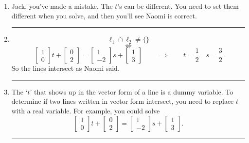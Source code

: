 \documentclass{article}
\begin{document}
	\begin{enumerate}
		\color{Violet} \vspace{.2cm} \hrule

		\item Jack, you've made a mistake. The $t$'s can be different.
			You need to set them different when you solve, and then
			you'll see Naomi is correct.

			\vspace{.2cm} \hrule

		\item
			\[
				\ell_{1}\cap \ell_{2}\neq \{\}
			\]
			\[
				\iff
			\]
			\[
				\begin{bmatrix}
					1\\
					0
				\end{bmatrix}t +
				\begin{bmatrix}
					0\\
					2
				\end{bmatrix}=
				\begin{bmatrix}
					1 \\
					-2
				\end{bmatrix}s +
				\begin{bmatrix}
					1\\
					3
				\end{bmatrix}\qquad\implies\qquad t=\frac{1}{2}\quad
				s=\frac{3}{2}
			\]
			 So the lines intersect as Naomi said. \vspace{.2cm}
			\hrule

		\item The `$t$' that shows up in the vector form of a line is a dummy
			variable. To determine if two lines written in vector form
			intersect, you need to replace $t$ with a real variable.
			For example, you could solve
			\[
				\begin{bmatrix}
					1\\
					0
				\end{bmatrix}t +
				\begin{bmatrix}
					0\\
					2
				\end{bmatrix}=
				\begin{bmatrix}
					1 \\
					-2
				\end{bmatrix}s +
				\begin{bmatrix}
					1\\
					3
				\end{bmatrix}.
			\]
			 \vspace{.2cm} \hrule
	\end{enumerate}
\end{document}
